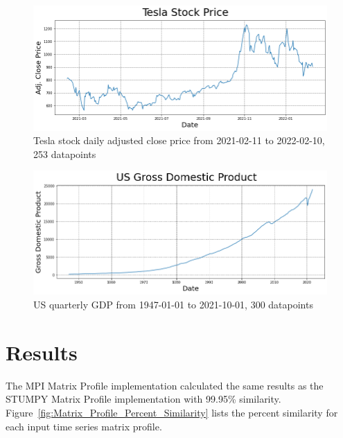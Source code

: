 \documentclass[conference]{IEEEtran}
\begin{document}
\begin{figure}
\begin{center}
\includegraphics[scale=0.42]{TSLA_time_series.png}
\caption{Tesla stock daily adjusted close price from 2021-02-11 to 2022-02-10, 253 datapoints}
\label{fig:TSLA_time_series}
\end{center}
\end{figure}

\begin{figure}
\begin{center}
\includegraphics[scale=0.42]{GDP_time_series.png}
\caption{US quarterly GDP from 1947-01-01 to 2021-10-01, 300 datapoints}
\label{fig:GDP_time_series}
\end{center}
\end{figure}


\section{Results}

The MPI Matrix Profile implementation calculated the same results as the STUMPY Matrix Profile implementation with 99.95\% similarity.  Figure~\ref{fig:Matrix_Profile_Percent_Similarity} lists the percent similarity for each input time series matrix profile. 
\end{document}
